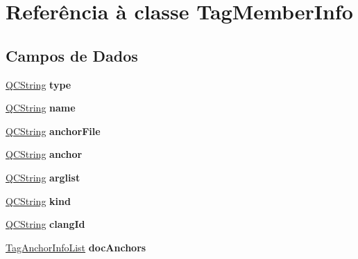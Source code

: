 \hypertarget{class_tag_member_info}{\section{Referência à classe Tag\-Member\-Info}
\label{class_tag_member_info}
}
\subsection*{Campos de Dados}
\begin{DoxyCompactItemize}
\item 
\hypertarget{class_tag_member_info_a0d4463771e24026060ae68b04822d7af}{\hyperlink{class_q_c_string}{Q\-C\-String} {\bfseries type}}\label{class_tag_member_info_a0d4463771e24026060ae68b04822d7af}

\item 
\hypertarget{class_tag_member_info_adc0097c7bd1e61ad32058fcde425bc7a}{\hyperlink{class_q_c_string}{Q\-C\-String} {\bfseries name}}\label{class_tag_member_info_adc0097c7bd1e61ad32058fcde425bc7a}

\item 
\hypertarget{class_tag_member_info_a5147541b9bfacbd82d3dff92c4860f7b}{\hyperlink{class_q_c_string}{Q\-C\-String} {\bfseries anchor\-File}}\label{class_tag_member_info_a5147541b9bfacbd82d3dff92c4860f7b}

\item 
\hypertarget{class_tag_member_info_a77f4824b029885f469aa2903eabf92d4}{\hyperlink{class_q_c_string}{Q\-C\-String} {\bfseries anchor}}\label{class_tag_member_info_a77f4824b029885f469aa2903eabf92d4}

\item 
\hypertarget{class_tag_member_info_a3313362189ac8ea17a62276cd210f591}{\hyperlink{class_q_c_string}{Q\-C\-String} {\bfseries arglist}}\label{class_tag_member_info_a3313362189ac8ea17a62276cd210f591}

\item 
\hypertarget{class_tag_member_info_a2919507646ae577384e68252252bcf3c}{\hyperlink{class_q_c_string}{Q\-C\-String} {\bfseries kind}}\label{class_tag_member_info_a2919507646ae577384e68252252bcf3c}

\item 
\hypertarget{class_tag_member_info_a9adedad08b4182d4cb771d92bac11fcc}{\hyperlink{class_q_c_string}{Q\-C\-String} {\bfseries clang\-Id}}\label{class_tag_member_info_a9adedad08b4182d4cb771d92bac11fcc}

\item 
\hypertarget{class_tag_member_info_a3a6c53fe1869a01e3748ec5898a54458}{\hyperlink{class_tag_anchor_info_list}{Tag\-Anchor\-Info\-List} {\bfseries doc\-Anchors}}\label{class_tag_member_info_a3a6c53fe1869a01e3748ec5898a54458}


\end{DoxyCompactItemize}
